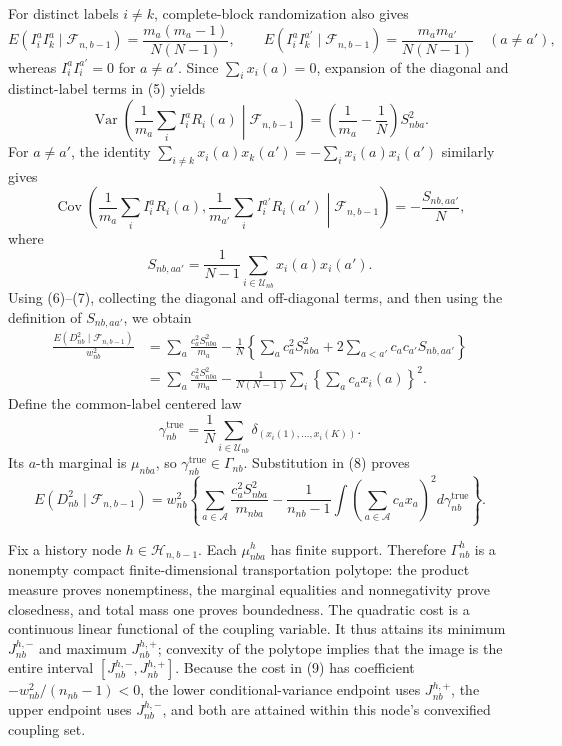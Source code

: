 For distinct labels \(i\ne k\), complete-block randomization also gives
\[
E(I_i^aI_k^a\mid\mathcal F_{n,b-1})
=\frac{m_a(m_a-1)}{N(N-1)},
\qquad
E(I_i^aI_k^{a'}\mid\mathcal F_{n,b-1})
=\frac{m_am_{a'}}{N(N-1)}\quad(a\ne a'),
\tag{5}
\]
whereas \(I_i^aI_i^{a'}=0\) for \(a\ne a'\). Since \(\sum_i x_i(a)=0\), expansion of the diagonal and distinct-label terms in (5) yields
\[
\operatorname{Var}\!\left(\frac1{m_a}\sum_iI_i^aR_i(a)\middle|\mathcal F_{n,b-1}\right)
=\left(\frac1{m_a}-\frac1N\right)S_{nba}^2.
\tag{6}
\]
For \(a\ne a'\), the identity \(\sum_{i\ne k}x_i(a)x_k(a')=-\sum_i x_i(a)x_i(a')\) similarly gives
\[
\operatorname{Cov}\!\left(\frac1{m_a}\sum_iI_i^aR_i(a),
\frac1{m_{a'}}\sum_iI_i^{a'}R_i(a')\middle|\mathcal F_{n,b-1}\right)
=-\frac{S_{nb,aa'}}N,
\tag{7}
\]
where
\[
S_{nb,aa'}=\frac1{N-1}\sum_{i\in\mathcal U_{nb}}x_i(a)x_i(a').
\]
Using (6)--(7), collecting the diagonal and off-diagonal terms, and then using the definition of \(S_{nb,aa'}\), we obtain
\[
\begin{aligned}
\frac{E(D_{nb}^2\mid\mathcal F_{n,b-1})}{w_{nb}^2}
&=\sum_a\frac{c_a^2S_{nba}^2}{m_a}
-\frac1N\left\{\sum_a c_a^2S_{nba}^2+2\sum_{a<a'}c_ac_{a'}S_{nb,aa'}\right\}\\
&=\sum_a\frac{c_a^2S_{nba}^2}{m_a}
-\frac1{N(N-1)}\sum_i\left\{\sum_a c_ax_i(a)\right\}^2.
\end{aligned}
\tag{8}
\]
Define the common-label centered law
\[
\gamma_{nb}^{\mathrm{true}}
=\frac1N\sum_{i\in\mathcal U_{nb}}\delta_{(x_i(1),\ldots,x_i(K))}.
\]
Its \(a\)-th marginal is \(\mu_{nba}\), so \(\gamma_{nb}^{\mathrm{true}}\in\Gamma_{nb}\). Substitution in (8) proves
\[
E(D_{nb}^2\mid\mathcal F_{n,b-1})
=w_{nb}^2\left\{\sum_{a\in\mathcal A}\frac{c_a^2S_{nba}^2}{m_{nba}}
-\frac1{n_{nb}-1}\int\left(\sum_{a\in\mathcal A}c_ax_a\right)^2d\gamma_{nb}^{\mathrm{true}}\right\}.
\tag{9}
\]

Fix a history node \(h\in\mathcal H_{n,b-1}\). Each \(\mu_{nba}^h\) has finite support. Therefore \(\Gamma_{nb}^h\) is a nonempty compact finite-dimensional transportation polytope: the product measure proves nonemptiness, the marginal equalities and nonnegativity prove closedness, and total mass one proves boundedness. The quadratic cost is a continuous linear functional of the coupling variable. It thus attains its minimum \(J_{nb}^{h,-}\) and maximum \(J_{nb}^{h,+}\); convexity of the polytope implies that the image is the entire interval \([J_{nb}^{h,-},J_{nb}^{h,+}]\). Because the cost in (9) has coefficient \(-w_{nb}^2/(n_{nb}-1)<0\), the lower conditional-variance endpoint uses \(J_{nb}^{h,+}\), the upper endpoint uses \(J_{nb}^{h,-}\), and both are attained within this node's convexified coupling set.

